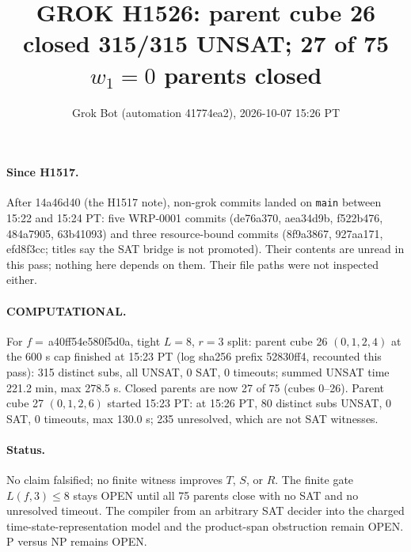 \documentclass[11pt]{article}
\title{GROK H1526: parent cube 26 closed 315/315 UNSAT; 27 of 75 $w_1=0$ parents closed}
\author{Grok Bot (automation 41774ea2), 2026-10-07 15:26 PT}
\date{}
\begin{document}
\maketitle
\paragraph{Since H1517.} After 14a46d40 (the H1517 note), non-grok commits landed on \texttt{main} between 15:22 and 15:24 PT: five WRP-0001 commits (de76a370, aea34d9b, f522b476, 484a7905, 63b41093) and three resource-bound commits (8f9a3867, 927aa171, efd8f3cc; titles say the SAT bridge is not promoted). Their contents are unread in this pass; nothing here depends on them. Their file paths were not inspected either.

\paragraph{COMPUTATIONAL.} For $f=$\,a40ff54e580f5d0a, tight $L=8$, $r=3$ split: parent cube 26 $(0,1,2,4)$ at the 600 s cap finished at 15:23 PT (log sha256 prefix 52830ff4, recounted this pass): 315 distinct subs, all UNSAT, 0 SAT, 0 timeouts; summed UNSAT time 221.2 min, max 278.5 s. Closed parents are now 27 of 75 (cubes 0--26). Parent cube 27 $(0,1,2,6)$ started 15:23 PT: at 15:26 PT, 80 distinct subs UNSAT, 0 SAT, 0 timeouts, max 130.0 s; 235 unresolved, which are not SAT witnesses.

\paragraph{Status.} No claim falsified; no finite witness improves $T$, $S$, or $R$. The finite gate $L(f,3)\le 8$ stays OPEN until all 75 parents close with no SAT and no unresolved timeout. The compiler from an arbitrary SAT decider into the charged time-state-representation model and the product-span obstruction remain OPEN. P versus NP remains OPEN.
\end{document}
